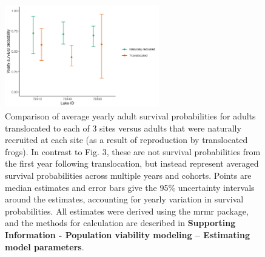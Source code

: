 \documentclass[9pt,twoside,lineno]{pnas-new}
\begin{document}
\begin{figure}

{\centering \includegraphics[width=0.60\textwidth]{figures/compare_surv_probs.jpg}

}

\caption{\label{fig-compare_surv_probs}Comparison of average yearly
adult survival probabilities for adults translocated to each of 3 sites
versus adults that were naturally recruited at each site (as a result of
reproduction by translocated frogs). In contrast to
Fig. 3, these are not survival
probabilities from the first year following translocation, but instead
represent averaged survival probabilities across multiple years and
cohorts. Points are median estimates and error bars give the 95\%
uncertainty intervals around the estimates, accounting for yearly
variation in survival probabilities. All estimates were derived using
the mrmr package, and the methods for calculation are described in
\textbf{Supporting Information - Population viability modeling --
Estimating model parameters}.}

\end{figure}\clearpage

\newpage
\end{document}
